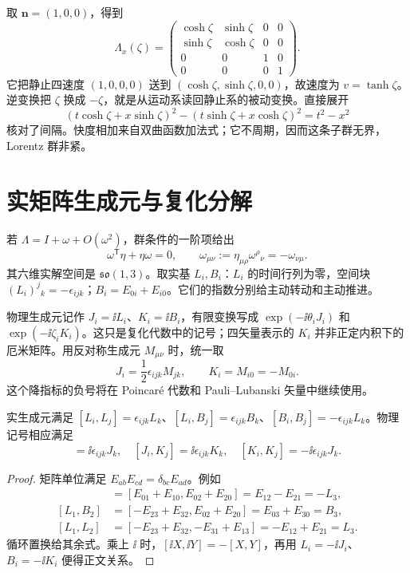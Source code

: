 \begin{workedexample}[沿第一轴的主动推进]
取 $\mathbf n=(1,0,0)$，得到
\[
 \Lambda_x(\zeta)=
 \begin{pmatrix}\cosh\zeta&\sinh\zeta&0&0\\
 \sinh\zeta&\cosh\zeta&0&0\\0&0&1&0\\0&0&0&1\end{pmatrix}.
\]
它把静止四速度 $(1,0,0,0)$ 送到 $(\cosh\zeta,\sinh\zeta,0,0)$，故速度为 $v=\tanh\zeta$。逆变换把 $\zeta$ 换成 $-\zeta$，就是从运动系读回静止系的被动变换。直接展开
\[
 (t\cosh\zeta+x\sinh\zeta)^2
 -(t\sinh\zeta+x\cosh\zeta)^2=t^2-x^2
\]
核对了间隔。快度相加来自双曲函数加法式；它不周期，因而这条子群无界，Lorentz 群非紧。
\end{workedexample}

\section{实矩阵生成元与复化分解}

\begin{definition}
若 $\Lambda=I+\omega+O(\omega^2)$，群条件的一阶项给出
\begin{equation}
 \omega^{\mathsf T}\eta+\eta\omega=0,
 \qquad \omega_{\mu\nu}:=\eta_{\mu\rho}\omega^\rho{}_\nu=-\omega_{\nu\mu}.
 \label{eq:lorentz-infinitesimal-condition}
\end{equation}
其六维实解空间是 $\mathfrak{so}(1,3)$。取实基 $L_i,B_i$：$L_i$ 的时间行列为零，空间块 $(L_i)^j{}_k=-\epsilon_{ijk}$；$B_i=E_{0i}+E_{i0}$。它们的指数分别给主动转动和主动推进。

物理生成元记作 $J_i=\ii L_i$、$K_i=\ii B_i$，有限变换写成 $\exp(-\ii\theta_iJ_i)$ 和 $\exp(-\ii\zeta_iK_i)$。这只是复化代数中的记号；四矢量表示的 $K_i$ 并非正定内积下的厄米矩阵。用反对称生成元 $M_{\mu\nu}$ 时，统一取
\[
 J_i=\frac12\epsilon_{ijk}M_{jk},\qquad K_i=M_{i0}=-M_{0i}.
\]
这个降指标的负号将在 Poincar\'e 代数和 Pauli--Lubanski 矢量中继续使用。
\end{definition}

\begin{proposition}
实生成元满足 $[L_i,L_j]=\epsilon_{ijk}L_k$、$[L_i,B_j]=\epsilon_{ijk}B_k$、$[B_i,B_j]=-\epsilon_{ijk}L_k$。物理记号相应满足
\begin{equation}
 [J_i,J_j]=\ii\epsilon_{ijk}J_k,\quad
 [J_i,K_j]=\ii\epsilon_{ijk}K_k,\quad
 [K_i,K_j]=-\ii\epsilon_{ijk}J_k.
 \label{eq:lorentz-algebra}
\end{equation}
\end{proposition}
\begin{proof}
矩阵单位满足 $E_{ab}E_{cd}=\delta_{bc}E_{ad}$。例如
\begin{align*}
 [B_1,B_2]&=[E_{01}+E_{10},E_{02}+E_{20}]=E_{12}-E_{21}=-L_3,\\
 [L_1,B_2]&=[-E_{23}+E_{32},E_{02}+E_{20}]=E_{03}+E_{30}=B_3,\\
 [L_1,L_2]&=[-E_{23}+E_{32},-E_{31}+E_{13}]=-E_{12}+E_{21}=L_3.
\end{align*}
循环置换给其余式。乘上 $\ii$ 时，$[\ii X,\ii Y]=-[X,Y]$，再用 $L_i=-\ii J_i$、$B_i=-\ii K_i$ 便得正文关系。
\end{proof}

